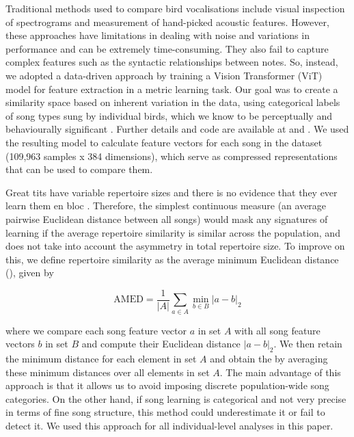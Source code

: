 Traditional methods used to compare bird vocalisations include visual inspection of spectrograms and measurement of hand-picked acoustic features. However, these approaches have limitations in dealing with noise and variations in performance and can be extremely time-consuming. They also fail to capture complex features such as the syntactic relationships between notes. So, instead, we adopted a data-driven approach by training a Vision Transformer (ViT) model for feature extraction in a metric learning task. Our goal was to create a similarity space based on inherent variation in the data, using categorical labels of song types sung by individual birds, which we know to be perceptually and behaviourally significant \parencite{lind1996}. Further details and code are available at \parencite{merinorecalde2023} and \parencite{merinorecalde2023a}. We used the resulting model to calculate feature vectors for each song in the dataset (109,963 samples x 384 dimensions), which serve as compressed representations that can be used to compare them.

Great tits have variable repertoire sizes and there is no evidence that they ever learn them en bloc \parencite{mcgregor1982b, rivera-gutierrez2010a}. Therefore, the simplest continuous measure (an average pairwise Euclidean distance between all songs) would mask any signatures of learning if the average repertoire similarity is similar across the population, and does not take into account the asymmetry in total repertoire size. To improve on this, we define repertoire similarity as the average minimum Euclidean distance (), given by

\begin{equation} 
\label{eq1}
\text{AMED} = \frac{1}{|A|} \sum_{a \in A} \min_{b \in B} \left| a - b \right|_2
\end{equation}


where we compare each song feature vector $a$ in set $A$ with all song feature vectors $b$ in set $B$ and compute their Euclidean distance $\left| a - b \right|_2$. We then retain the minimum distance for each element in set $A$ and obtain the  by averaging these minimum distances over all elements in set $A$.
The main advantage of this approach is that it allows us to avoid imposing discrete population-wide song categories. On the other hand, if song learning is categorical and not very precise in terms of fine song structure, this method could underestimate it or fail to detect it. We used this approach for all individual-level analyses in this paper. 


